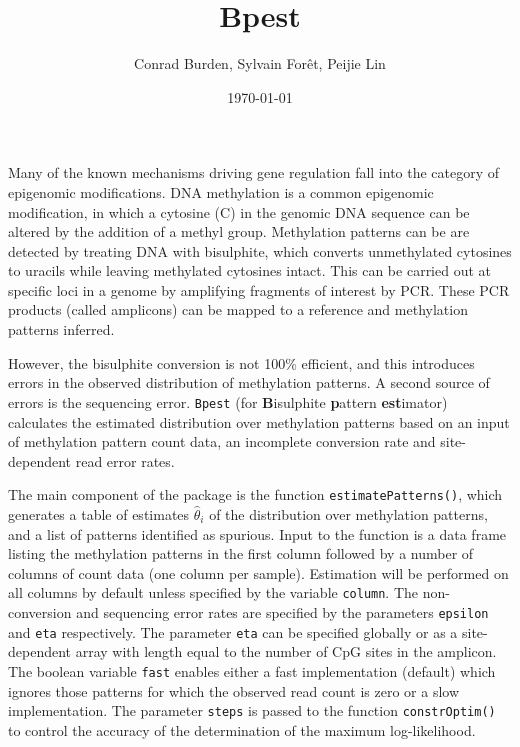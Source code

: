 \documentclass[12pt]{article}
\begin{document}


\title{Bpest}
\author{Conrad Burden, Sylvain For\^et, Peijie Lin}
\date{\today}
\maketitle

Many of the known mechanisms driving gene regulation fall into the category of epigenomic modifications.
DNA methylation is a common epigenomic modification, in which a cytosine (C) in the genomic DNA sequence can be altered by the addition of a methyl group.
Methylation patterns can be are detected by treating DNA with bisulphite, which converts unmethylated cytosines to uracils while leaving methylated cytosines intact.
This can be carried out at specific loci in a genome by amplifying fragments of interest by PCR.
These PCR products (called amplicons) can be mapped to a reference and methylation patterns inferred. 

However, the bisulphite conversion is not 100\% efficient, and this introduces errors in the observed distribution of methylation patterns.
A second source of errors is the sequencing error.
{\tt Bpest} (for \textbf{B}isulphite \textbf{p}attern \textbf{est}imator)~\cite{Lin04} calculates the estimated distribution over methylation patterns based on an input of methylation pattern count data, an incomplete conversion rate and site-dependent read error rates.

The main component of the package is the function {\tt estimatePatterns()}, which generates a table of estimates $\hat\theta_i$ of the distribution over methylation patterns, and a list of patterns identified as spurious.
Input to the function is a data frame listing the methylation patterns in the first column followed by a number of columns of count data (one column per sample). 
Estimation will be performed on all columns by default unless specified by the variable {\tt column}. The non-conversion and sequencing error rates are specified by the parameters {\tt epsilon} and {\tt eta} respectively. 
The parameter {\tt eta} can be specified globally or as a site-dependent 
array with length equal to the number of CpG sites in the amplicon. 
The boolean variable {\tt fast} enables either a fast implementation (default) which ignores those patterns for which the observed read count is zero or a slow implementation.
The parameter {\tt steps} is passed to the function {\tt constrOptim()} to control the accuracy of the determination of the maximum log-likelihood.
\end{document}
